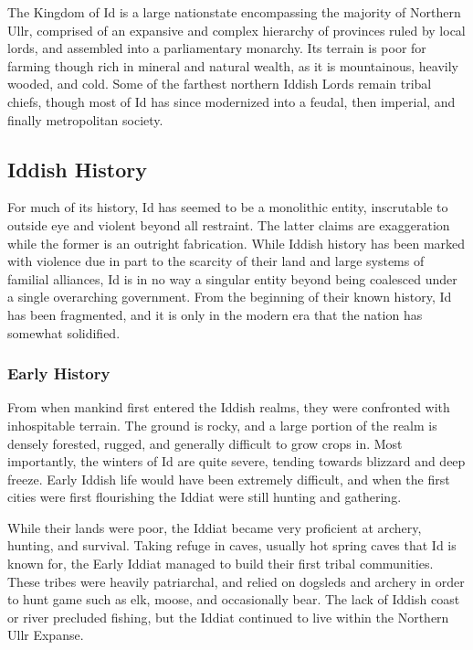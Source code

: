 			The Kingdom of Id is a large nationstate encompassing the majority of Northern Ullr, comprised of an expansive and complex hierarchy of provinces ruled by local lords, and assembled into a parliamentary monarchy. Its terrain is poor for farming though rich in mineral and natural wealth, as it is mountainous, heavily wooded, and cold. Some of the farthest northern Iddish Lords remain tribal chiefs, though most of Id has since modernized into a feudal, then imperial, and finally metropolitan society.
			
			\subsection{Iddish History}
			For much of its history, Id has seemed to be a monolithic entity, inscrutable to outside eye and violent beyond all restraint. The latter claims are exaggeration while the former is an outright fabrication. While Iddish history has been marked with violence due in part to the scarcity of their land and large systems of familial alliances, Id is in no way a singular entity beyond being coalesced under a single overarching government. From the beginning of their known history, Id has been fragmented, and it is only in the modern era that the nation has somewhat solidified. 
			
			\subsubsection{Early History}\par
			From when mankind first entered the Iddish realms, they were confronted with inhospitable terrain. The ground is rocky, and a large portion of the realm is densely forested, rugged, and generally difficult to grow crops in. Most importantly, the winters of Id are quite severe, tending towards blizzard and deep freeze. Early Iddish life would have been extremely difficult, and when the first cities were first flourishing the Iddiat were still hunting and gathering.\par
			
			While their lands were poor, the Iddiat became very proficient at archery, hunting, and survival. Taking refuge in caves, usually hot spring caves that Id is known for, the Early Iddiat managed to build their first tribal communities. These tribes were heavily patriarchal, and relied on dogsleds and archery in order to hunt game such as elk, moose, and occasionally bear. The lack of Iddish coast or river precluded fishing, but the Iddiat continued to live within the Northern Ullr Expanse.\par 
			
